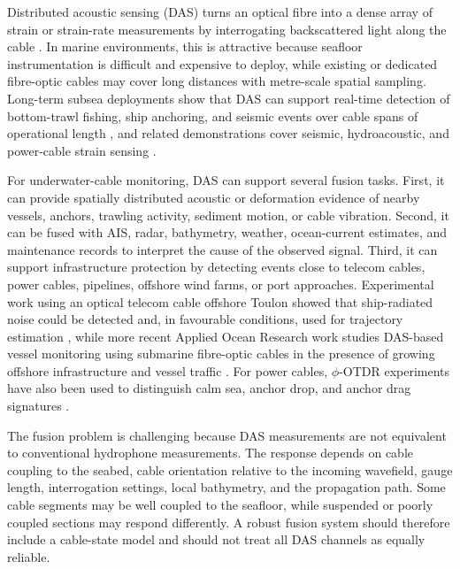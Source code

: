 \documentclass[11pt,oneside,openany]{book}
\begin{document}
Distributed acoustic sensing (DAS) turns an optical fibre into a dense array of strain or strain-rate measurements by interrogating backscattered light along the cable \cite{hartog_intro_2017,lu_distributed_2019,lindsey_fiberoptic_2021}. In marine environments, this is attractive because seafloor instrumentation is difficult and expensive to deploy, while existing or dedicated fibre-optic cables may cover long distances with metre-scale spatial sampling. Long-term subsea deployments show that DAS can support real-time detection of bottom-trawl fishing, ship anchoring, and seismic events over cable spans of operational length \cite{waagaard_longterm_2022}, and related demonstrations cover seismic, hydroacoustic, and power-cable strain sensing \cite{williams_distributed_2019,matsumoto_hydroacoustic_2021,masoudi_dynamic_2018}.

For underwater-cable monitoring, DAS can support several fusion tasks. First, it can provide spatially distributed acoustic or deformation evidence of nearby vessels, anchors, trawling activity, sediment motion, or cable vibration. Second, it can be fused with AIS, radar, bathymetry, weather, ocean-current estimates, and maintenance records to interpret the cause of the observed signal. Third, it can support infrastructure protection by detecting events close to telecom cables, power cables, pipelines, offshore wind farms, or port approaches. Experimental work using an optical telecom cable offshore Toulon showed that ship-radiated noise could be detected and, in favourable conditions, used for trajectory estimation \cite{rivet_ship_2021}, while more recent Applied Ocean Research work studies DAS-based vessel monitoring using submarine fibre-optic cables in the presence of growing offshore infrastructure and vessel traffic \cite{paap_vessel_2025}. For power cables, \(\phi\)-OTDR experiments have also been used to distinguish calm sea, anchor drop, and anchor drag signatures \cite{lv_otdr_2018}.

The fusion problem is challenging because DAS measurements are not equivalent to conventional hydrophone measurements. The response depends on cable coupling to the seabed, cable orientation relative to the incoming wavefield, gauge length, interrogation settings, local bathymetry, and the propagation path. Some cable segments may be well coupled to the seafloor, while suspended or poorly coupled sections may respond differently. A robust fusion system should therefore include a cable-state model and should not treat all DAS channels as equally reliable.
\end{document}

